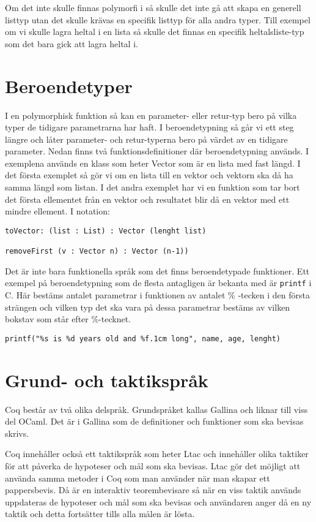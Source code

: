 Om det inte skulle finnas polymorfi i \coq så skulle det inte gå att skapa en
generell listtyp utan det skulle krävas en specifik listtyp för alla andra
typer. Till exempel om vi skulle lagra heltal i en lista så skulle det finnas
en specifik heltalsliste-typ som det bara gick att lagra heltal i.

\section{Beroendetyper}
I en polymorphisk funktion så kan en parameter- eller retur-typ bero på vilka
typer de tidigare parametrarna har haft. I beroendetypning så går vi ett steg
längre och låter parameter- och retur-typerna bero på värdet av en
tidigare parameter.
Nedan finns två funktionsdefinitioner där beroendetypning används.
I exemplena används en klass som heter Vector som är en lista med fast längd. I
det första exemplet så gör vi om en lista till en vektor och vektorn ska då ha
samma längd som listan. I det andra exemplet har vi en funktion som tar bort
det första ellementet från en vektor och resultatet blir då en vektor med ett
mindre ellement. I \coq notation:
\begin{verbatim}
toVector: (list : List) : Vector (lenght list)

removeFirst (v : Vector n) : Vector (n-1))
\end{verbatim}

Det är inte bara funktionella språk som det finns beroendetypade funktioner.
Ett exempel på beroendetypning som de flesta antagligen är bekanta med är
\texttt{printf} i C. Här bestäms antalet parametrar i funktionen av antalet
\% -tecken i den första strängen och vilken typ det ska vara på dessa
parametrar bestäms av vilken bokstav som står efter \%-tecknet.
\begin{verbatim}
printf("%s is %d years old and %f.1cm long", name, age, lenght)
\end{verbatim}


\section{Grund- och taktikspråk}
Coq består av två olika delspråk. Grundspråket kallas Gallina och liknar till
viss del OCaml. Det är i Gallina som de definitioner och funktioner som ska
bevisas skrivs.

Coq innehåller också ett taktikspråk som heter Ltac och innehåller olika
taktiker för att påverka de hypoteser och mål som ska bevisas. Ltac gör det
möjligt att använda samma metoder i Coq som man använder när man skapar ett
pappersbevis. Då \coq är en interaktiv teorembevisare så när en viss taktik
används uppdateras de hypoteser och mål som ska bevisas och användaren
anger då en ny taktik och detta fortsätter tills alla målen är lösta.

